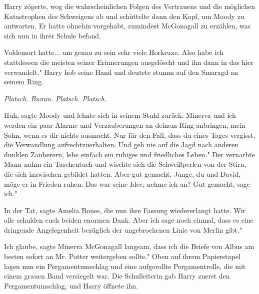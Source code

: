 Harry zögerte, wog die wahrscheinlichen Folgen des Vertrauens und die möglichen
Katastrophen des Schweigens ab und schüttelte dann den Kopf, um Moody zu
antworten. Er hatte ohnehin vorgehabt, zumindest McGonagall zu erzählen, was
sich nun in ihrer Schule befand.

\glqq Voldemort hatte... um genau zu sein sehr viele Horkruxe. Also habe ich
stattdessen die meisten seiner Erinnerungen ausgelöscht und ihn dann in das hier
verwandelt." Harry hob seine Hand und deutete stumm auf den Smaragd an seinem
Ring.

\emph{Platsch. Bumm. Platsch. Platsch.}

\glqq Huh\grqq{}, sagte Moody und lehnte sich in seinem Stuhl zurück. \glqq
Minerva und ich werden ein paar Alarme und Verzauberungen an deinem Ring
anbringen, mein Sohn, wenn es dir nichts ausmacht. Nur für den Fall, dass du
eines Tages vergisst, die Verwandlung aufrechtzuerhalten. Und geh nie auf die
Jagd nach anderen dunklen Zauberern, lebe einfach ein ruhiges und friedliches
Leben." Der vernarbte Mann nahm ein Taschentuch und wischte sich die
Schweißperlen von der Stirn, die sich inzwischen gebildet hatten. \glqq Aber gut
gemacht, Junge, du und David, möge er in Frieden ruhen. Das war seine Idee,
nehme ich an? Gut gemacht, sage ich."

\glqq In der Tat\grqq{}, sagte Amelia Bones, die nun ihre Fassung wiedererlangt
hatte. \glqq Wir alle schulden euch beiden enormen Dank. Aber ich sage noch
einmal, dass es eine dringende Angelegenheit bezüglich der ungebrochenen Linie
von Merlin gibt."

\glqq Ich glaube\grqq{}, sagte Minerva McGonagall langsam, \glqq dass ich die
Briefe von Albus am besten sofort an Mr. Potter weitergeben sollte." Oben auf
ihrem Papierstapel lagen nun ein Pergamentumschlag und eine aufgerollte
Pergamentrolle, die mit einem grauen Band versiegelt war. Die Schulleiterin gab
Harry zuerst den Pergamentumschlag, und Harry öffnete ihn.

